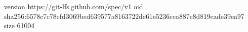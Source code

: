 version https://git-lfs.github.com/spec/v1
oid sha256:6578c7c78cfd3069bed639577a8163722de61e5236cea887c8d819cade39ea97
size 61004
